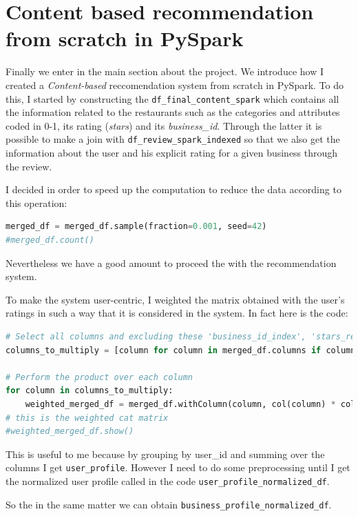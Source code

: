 \documentclass[12pt,english]{report}
\begin{document}
\section{Content based recommendation from scratch in PySpark}\label{sec:cbrfsip}
Finally we enter in the main section about the project. We introduce how I created a \textit{Content-based} reccomendation system from scratch in PySpark.
To do this, I started by constructing the \texttt{df\_final\_content\_spark} which contains all the information related to the restaurants such as the categories and attributes coded in 0-1, its rating (\textit{stars}) and its \textit{business\_id}. Through the latter it is possible to make a join with \texttt{df\_review\_spark\_indexed} so that we also get the information about the user and his explicit rating for a given business through the review.\par
I decided in order to speed up the computation to reduce the data according to this operation:
\begin{lstlisting}[language={Python},escapechar=|,label={lst:fractiondata},caption={Fractioning data}]
merged_df = merged_df.sample(fraction=0.001, seed=42)
#merged_df.count()
\end{lstlisting}
Nevertheless we have a good amount to proceed the with the recommendation system.\par
To make the system user-centric, I weighted the matrix obtained with the user's ratings in such a way that it is considered in the system. In fact here is the code:
\begin{lstlisting}[language={Python},escapechar=|,label={lst:weightedmatrix},caption={Weighted the business matrix with the user review rate}]
# Select all columns and excluding these 'business_id_index', 'stars_review', 'user_id_index'
columns_to_multiply = [column for column in merged_df.columns if column not in ['business_id_index', 'stars_review', 'user_id_index','stars']]

# Perform the product over each column
for column in columns_to_multiply:
    weighted_merged_df = merged_df.withColumn(column, col(column) * col('stars_review'))
# this is the weighted cat matrix
#weighted_merged_df.show()
\end{lstlisting}
This is useful to me because by grouping by user\_id and summing over the columns I get \texttt{user\_profile}.
However I need to do some preprocessing until I get the normalized user profile called in the code \texttt{user\_profile\_normalized\_df}.\par
So the in the same matter we can obtain \texttt{business\_profile\_normalized\_df}.
\end{document}
